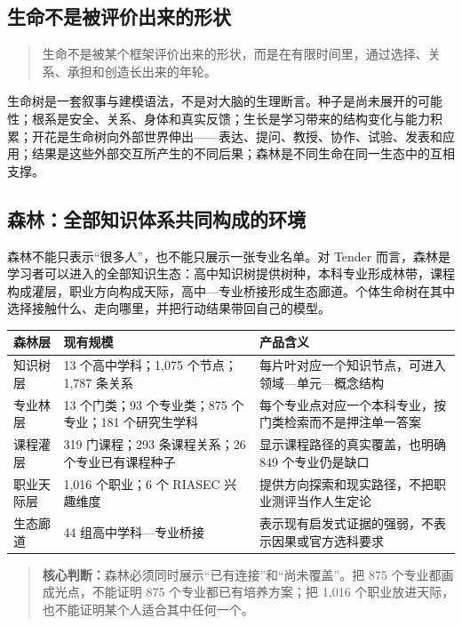\documentclass[UTF8,a4paper,11pt]{ctexart}
\newcommand{\keypoint}[1]{\begin{quote}\noindent\textbf{\color{TenderBlue}核心判断：}#1\end{quote}}
\begin{document}
\subsection{生命不是被评价出来的形状}

\begin{quote}
\large
生命不是被某个框架评价出来的形状，而是在有限时间里，通过选择、关系、承担和创造长出来的年轮。
\end{quote}

生命树是一套叙事与建模语法，不是对大脑的生理断言。种子是尚未展开的可能性；根系是安全、关系、身体和真实反馈；生长是学习带来的结构变化与能力积累；开花是生命树向外部世界伸出——表达、提问、教授、协作、试验、发表和应用；结果是这些外部交互所产生的不同后果；森林是不同生命在同一生态中的互相支撑。

\subsection{森林：全部知识体系共同构成的环境}

森林不能只表示“很多人”，也不能只展示一张专业名单。对 Tender 而言，森林是学习者可以进入的全部知识生态：高中知识树提供树种，本科专业形成林带，课程构成灌层，职业方向构成天际，高中—专业桥接形成生态廊道。个体生命树在其中选择接触什么、走向哪里，并把行动结果带回自己的模型。

\begin{center}
\begin{longtable}{@{}p{2.8cm}p{4.2cm}p{6.2cm}@{}}
\toprule
\textbf{森林层} & \textbf{现有规模} & \textbf{产品含义} \\
\midrule
知识树层 & 13 个高中学科；1,075 个节点；1,787 条关系 & 每片叶对应一个知识节点，可进入领域—单元—概念结构 \\
专业林层 & 13 个门类；93 个专业类；875 个专业；181 个研究生学科 & 每个专业点对应一个本科专业，按门类检索而不是押注单一答案 \\
课程灌层 & 319 门课程；293 条课程关系；26 个专业已有课程种子 & 显示课程路径的真实覆盖，也明确 849 个专业仍是缺口 \\
职业天际层 & 1,016 个职业；6 个 RIASEC 兴趣维度 & 提供方向探索和现实路径，不把职业测评当作人生定论 \\
生态廊道 & 44 组高中学科—专业桥接 & 表示现有启发式证据的强弱，不表示因果或官方选科要求 \\
\bottomrule
\end{longtable}
\end{center}

\keypoint{森林必须同时展示“已有连接”和“尚未覆盖”。把 875 个专业都画成光点，不能证明 875 个专业都已有培养方案；把 1,016 个职业放进天际，也不能证明某个人适合其中任何一个。}
\end{document}
